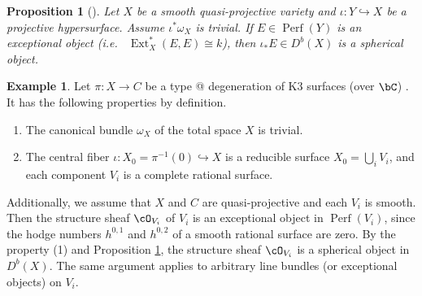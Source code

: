 \documentclass{amsart}
\makeatletter
\numberwithin{equation}{section}
\theoremstyle{plain}
\newtheorem{proposition}[theorem]{Proposition}
\theoremstyle{definition}
\newtheorem{example}[theorem]{Example}
\DeclareMathOperator{\Perf}{\mathrm{Perf}}
\DeclareMathOperator{\Ext}{\mathrm{Ext}}
\newcommand*{\rom}[1]{\expandafter\@slowromancap\romannumeral #1@}
\makeatother
\begin{document}
\begin{proposition}[{\cite[Proposition 3.15]{MR1831820}}]\label{prop:exceptional-to-spherical}
    Let $X$ be a smooth quasi-projective variety and $\iota \colon Y \hookrightarrow X$ be a projective hypersurface.
    Assume $\iota^*\omega_X$ is trivial.
    If $E \in \Perf(Y)$ is an \emph{exceptional object} (i.e.~ $\Ext^*_X(E, E) \cong k$), then $\iota_*E \in D^b(X)$ is a spherical object.
\end{proposition}
\begin{example}\label{ex:spherical-object-from-K3-degeneration}
    Let $\pi \colon X \to C$ be a type \rom{3} degeneration of K3 surfaces (over $\bC$) \cite{}.
    It has the following properties by definition.
    \begin{enumerate}
        \item The canonical bundle $\omega_X$ of the total space $X$ is trivial.
        \item The central fiber $\iota \colon X_0 = \pi^{-1}(0) \hookrightarrow X$ is a reducible surface $X_0 = \bigcup_i V_i$, and each component $V_i$ is a complete rational surface.
    \end{enumerate}
    Additionally, we assume that $X$ and $C$ are quasi-projective and each $V_i$ is smooth.
    Then the structure sheaf $\cO_{V_i}$ of $V_i$ is an exceptional object in $\Perf(V_i)$, since the hodge numbers $h^{0,1}$ and $h^{0,2}$ of a smooth rational surface are zero.
    By the property (1) and Proposition \ref{prop:exceptional-to-spherical}, the structure sheaf $\cO_{V_i}$ is a spherical object in $D^b(X)$.
    The same argument applies to arbitrary line bundles (or exceptional objects) on $V_i$.


\end{example}
\end{document}
